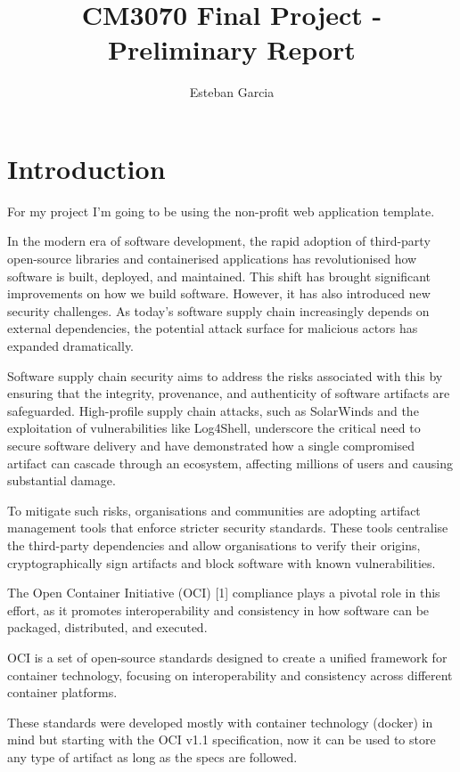 \documentclass{article}
\title{CM3070 Final Project - Preliminary Report}
\author{Esteban Garcia}
\date{ }
\begin{document}
  \maketitle

  \tableofcontents

  \newpage
  \section{Introduction}

  For my project I'm going to be using the non-profit web application template.

  In the modern era of software development, the rapid adoption of third-party open-source libraries and containerised applications has revolutionised how software is built, deployed, and maintained. This shift has brought significant improvements on how we build software. However, it has also introduced new security challenges. As today's software supply chain increasingly depends on external dependencies, the potential attack surface for malicious actors has expanded dramatically.

  Software supply chain security aims to address the risks associated with this by ensuring that the integrity, provenance, and authenticity of software artifacts are safeguarded. High-profile supply chain attacks, such as SolarWinds and the exploitation of vulnerabilities like Log4Shell, underscore the critical need to secure software delivery and have demonstrated how a single compromised artifact can cascade through an ecosystem, affecting millions of users and causing substantial damage.

  To mitigate such risks, organisations and communities are adopting artifact management tools that enforce stricter security standards. These tools centralise the third-party dependencies and allow organisations to verify their origins, cryptographically sign artifacts and block software with known vulnerabilities.

  The Open Container Initiative (OCI) [1] compliance plays a pivotal role in this effort, as it promotes interoperability and consistency in how software can be packaged, distributed, and executed.

  OCI is a set of open-source standards designed to create a unified framework for container technology, focusing on interoperability and consistency across different container platforms.

  These standards were developed mostly with container technology (docker) in mind but starting with the OCI v1.1 specification, now it can be used to store any type of artifact as long as the specs are followed.
\end{document}
